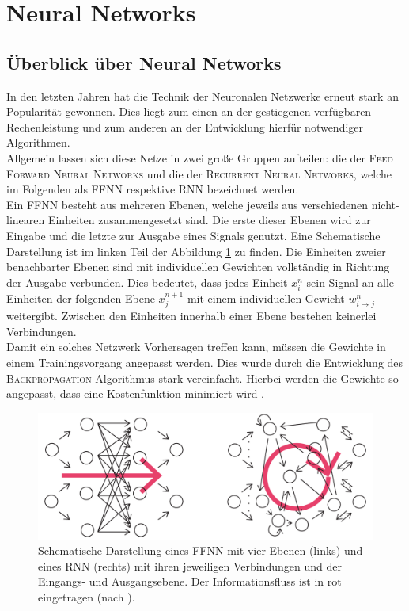 \section{Neural Networks}
\subsection{Überblick über Neural Networks}
In den letzten Jahren hat die Technik der Neuronalen Netzwerke erneut stark an Popularität gewonnen. Dies liegt zum einen an der gestiegenen verfügbaren Rechenleistung und zum anderen an der Entwicklung hierfür notwendiger Algorithmen.\\
Allgemein lassen sich diese Netze in zwei große Gruppen aufteilen: die der \textsc{Feed Forward Neural Networks} und die der \textsc{Recurrent Neural Networks}, welche im Folgenden als \textsc{FFNN} respektive \textsc{RNN} bezeichnet werden.\\

Ein \textsc{FFNN} besteht aus mehreren Ebenen, welche jeweils aus verschiedenen nicht-linearen Einheiten zusammengesetzt sind. Die erste dieser Ebenen wird zur Eingabe und die letzte zur Ausgabe eines Signals genutzt. Eine Schematische Darstellung ist im linken Teil der Abbildung \ref{fig:ffnn_rnn_structure} zu finden. Die Einheiten zweier benachbarter Ebenen sind mit individuellen Gewichten vollständig in Richtung der Ausgabe verbunden. Dies bedeutet, dass jedes Einheit $x^n_i$ sein Signal an alle Einheiten der folgenden Ebene $x^{n+1}_j$ mit einem individuellen Gewicht $w^n_{i \rightarrow j}$ weitergibt. Zwischen den Einheiten innerhalb einer Ebene bestehen keinerlei Verbindungen.\\
Damit ein solches Netzwerk Vorhersagen treffen kann, müssen die Gewichte in einem Trainingsvorgang angepasst werden. Dies wurde durch die Entwicklung des \textsc{Backpropagation}-Algorithmus stark vereinfacht. Hierbei werden die Gewichte so angepasst, dass eine Kostenfunktion minimiert wird \cite[S. 225-290]{bishop}.\\

\begin{figure}[H]
    \centering
    \includegraphics[width = 0.9 \textwidth]{figures/ffnn_rnn_structure(new).pdf}
    \caption{Schematische Darstellung eines \textsc{FFNN} mit vier Ebenen (links) und eines \textsc{RNN} (rechts) mit ihren jeweiligen Verbindungen und der Eingangs- und Ausgangsebene. Der Informationsfluss ist in rot eingetragen (nach \citep{jeagerTut2002}).}
    \label{fig:ffnn_rnn_structure}
\end{figure}


